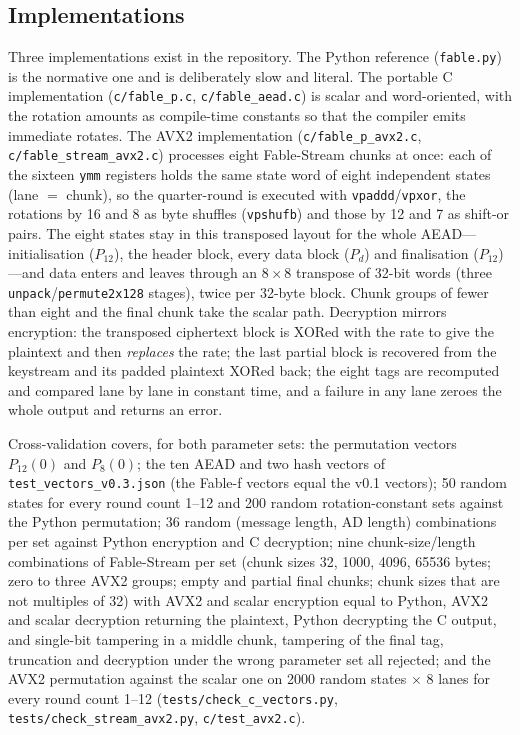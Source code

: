 \documentclass{iacrtrans}
\newcommand{\FableF}{\textsf{Fable-f}\xspace}
\newcommand{\FableStream}{\textsf{Fable-Stream}\xspace}
\newcommand{\PP}[1]{P_{#1}}
\begin{document}
\subsection{Implementations}
\label{sec:impls}
Three implementations exist in the repository. The Python reference (\texttt{fable.py}) is the normative one and is deliberately slow and literal. The portable C implementation (\texttt{c/fable\_p.c}, \texttt{c/fable\_aead.c}) is scalar and word-oriented, with the rotation amounts as compile-time constants so that the compiler emits immediate rotates. The AVX2 implementation (\texttt{c/fable\_p\_avx2.c}, \texttt{c/fable\_stream\_avx2.c}) processes eight \FableStream chunks at once: each of the sixteen \texttt{ymm} registers holds the same state word of eight independent states (lane $=$ chunk), so the quarter-round is executed with \texttt{vpaddd}/\texttt{vpxor}, the rotations by 16 and 8 as byte shuffles (\texttt{vpshufb}) and those by 12 and 7 as shift-or pairs. The eight states stay in this transposed layout for the whole AEAD---initialisation ($\PP{12}$), the header block, every data block ($\PP{d}$) and finalisation ($\PP{12}$)---and data enters and leaves through an $8\times8$ transpose of 32-bit words (three \texttt{unpack}/\texttt{permute2x128} stages), twice per 32-byte block. Chunk groups of fewer than eight and the final chunk take the scalar path. Decryption mirrors encryption: the transposed ciphertext block is XORed with the rate to give the plaintext and then \emph{replaces} the rate; the last partial block is recovered from the keystream and its padded plaintext XORed back; the eight tags are recomputed and compared lane by lane in constant time, and a failure in any lane zeroes the whole output and returns an error.

Cross-validation covers, for both parameter sets: the permutation vectors $\PP{12}(0)$ and $\PP{8}(0)$; the ten AEAD and two hash vectors of \texttt{test\_vectors\_v0.3.json} (the \FableF vectors equal the v0.1 vectors); 50 random states for every round count 1--12 and 200 random rotation-constant sets against the Python permutation; 36 random (message length, AD length) combinations per set against Python encryption and C decryption; nine chunk-size/length combinations of \FableStream per set (chunk sizes 32, 1000, 4096, 65536 bytes; zero to three AVX2 groups; empty and partial final chunks; chunk sizes that are not multiples of 32) with AVX2 and scalar encryption equal to Python, AVX2 and scalar decryption returning the plaintext, Python decrypting the C output, and single-bit tampering in a middle chunk, tampering of the final tag, truncation and decryption under the wrong parameter set all rejected; and the AVX2 permutation against the scalar one on 2000 random states $\times$ 8 lanes for every round count 1--12 (\texttt{tests/check\_c\_vectors.py}, \texttt{tests/check\_stream\_avx2.py}, \texttt{c/test\_avx2.c}).
\end{document}
